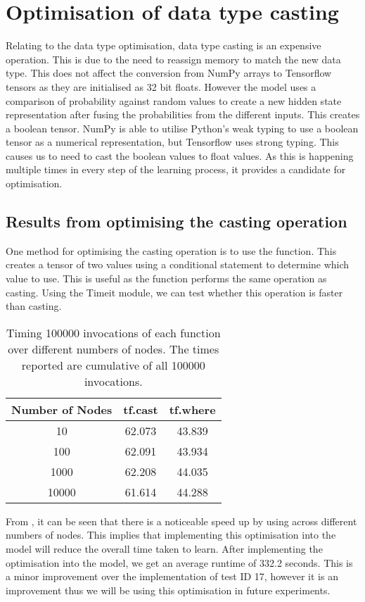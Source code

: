 \section{Optimisation of data type casting}
Relating to the data type optimisation, data type casting is an expensive operation.
This is due to the need to reassign memory to match the new data type.
This does not affect the conversion from NumPy arrays to Tensorflow tensors as they are initialised as 32 bit floats.
However the model uses a comparison of probability against random values to create a new hidden state representation after fusing the probabilities from the different inputs.
This creates a boolean tensor.
NumPy is able to utilise Python's weak typing to use a boolean tensor as a numerical representation, but Tensorflow uses strong typing.
This causes us to need to cast the boolean values to float values.
As this is happening multiple times in every step of the learning process, it provides a candidate for optimisation.

\subsection{Results from optimising the casting operation}
One method for optimising the casting operation is to use the  function.
This creates a tensor of two values using a conditional statement to determine which value to use.
This is useful as the  function performs the same operation as casting.
Using the Timeit module, we can test whether this operation is faster than casting.

\begin{table}[ht]
    \centering
    \begin{tabular}{|c|c|c|}
        \hline
        Number of Nodes & tf.cast & tf.where \\ \hline
        10              & 62.073  & 43.839   \\ \hline
        100             & 62.091  & 43.934   \\ \hline
        1000            & 62.208  & 44.035   \\ \hline
        10000           & 61.614  & 44.288   \\ \hline
    \end{tabular}
    \caption{Timing 100000 invocations of each function over different numbers of nodes. The times reported are cumulative of all 100000 invocations.
    }
    \label{tab:cast_v_where}
\end{table}


From , it can be seen that there is a noticeable speed up by using  across different numbers of nodes.
This implies that implementing this optimisation into the model will reduce the overall time taken to learn.
After implementing the optimisation into the model, we get an average runtime of 332.2 seconds.
This is a minor improvement over the implementation of test ID 17, however it is an improvement thus we will be using this optimisation in future experiments. 